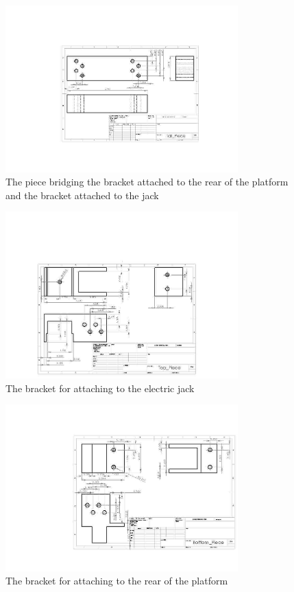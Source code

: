 \begin{figure}
\centering
 \includegraphics[width=0.8\textwidth]{images/Tall_Piece}
\caption{The piece bridging the bracket attached to the rear of the platform and the bracket attached to the jack}
\label{fig:tall_piece}
\end{figure}

\begin{figure}
\centering
 \includegraphics[width=0.8\textwidth]{images/Top_Piece}
\caption{The bracket for attaching to the electric jack}
\label{fig:top_piece}
\end{figure}

\begin{figure}
\centering
 \includegraphics[width=0.8\textwidth]{images/Bottom_Piece}
\caption{The bracket for attaching to the rear of the platform}
\label{fig:bottom_piece}
\end{figure}

